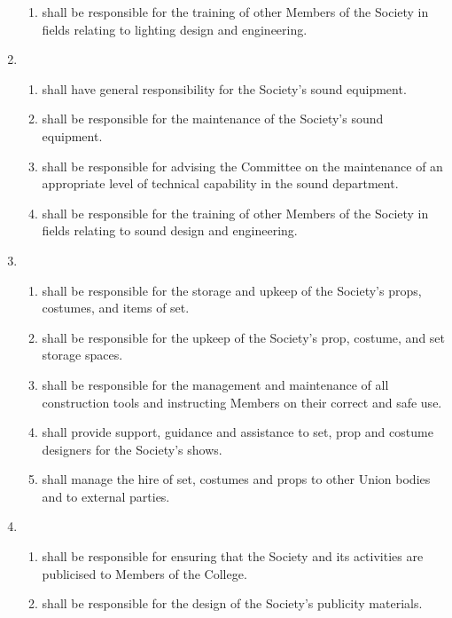\documentclass[a4paper]{tufte-handout}
\begin{document}
\begin{enumerate}[resume]
\begin{enumerate}
            \item shall be responsible for the training of other Members of the Society in fields relating to lighting design and engineering.
        \end{enumerate}
    \item {}
        \begin{enumerate}
            \item shall have general responsibility for the Society's sound equipment.
            \item shall be responsible for the maintenance of the Society's sound equipment.
            \item shall be responsible for advising the Committee on the maintenance of an appropriate level of technical capability in the sound department.
            \item shall be responsible for the training of other Members of the Society in fields relating to sound design and engineering.
        \end{enumerate}
    \item {}
        \begin{enumerate}
            \item shall be responsible for the storage and upkeep of the Society's props, costumes, and items of set.
            \item shall be responsible for the upkeep of the Society's prop, costume, and set storage spaces.
            \item shall be responsible for the management and maintenance of all construction tools and instructing Members on their correct and safe use.
            \item shall provide support, guidance and assistance to set, prop and costume designers for the Society's shows.
            \item shall manage the hire of set, costumes and props to other Union bodies and to external parties.
        \end{enumerate}
    \item {}
        \begin{enumerate}
            \item shall be responsible for ensuring that the Society and its activities are publicised to Members of the College.
            \item shall be responsible for the design of the Society's publicity materials.

\end{enumerate}
\end{enumerate}
\end{document}
